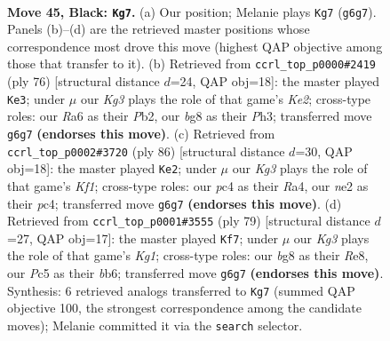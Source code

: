 \documentclass[11pt]{article}
\begin{document}
\clearpage

\begin{figure}[p]\centering
\begin{subfigure}{0.46\textwidth}\centering
\resizebox{\linewidth}{!}{%
\newchessgame
\chessboard[
  setfen={6B1/p3r3/r2p2k1/2p5/2P3P1/7K/4NR2/8 b - - 3 45},
  showmover=false,
  pgfstyle=straightmove, color=movearrow, markmove={g6-g7}
]}
\caption{}
\end{subfigure}\hfill
\begin{subfigure}{0.46\textwidth}\centering
\resizebox{\linewidth}{!}{%
\newchessgame
\chessboard[
  setfen={8/8/4pk1p/1pr5/5P2/PR5P/1P2K3/8 w - - 5 39},
  showmover=false,
  pgfstyle=straightmove, color=movearrow, markmove={e2-e3}
]}
\caption{}
\end{subfigure}
\\[4pt]
\begin{subfigure}{0.46\textwidth}\centering
\resizebox{\linewidth}{!}{%
\newchessgame
\chessboard[
  setfen={1r6/8/8/3kp3/RPp4r/P7/2R2P2/5K2 w - - 1 44},
  showmover=false,
  pgfstyle=straightmove, color=movearrow, markmove={f1-e2}
]}
\caption{}
\end{subfigure}\hfill
\begin{subfigure}{0.46\textwidth}\centering
\resizebox{\linewidth}{!}{%
\newchessgame
\chessboard[
  setfen={4r1k1/1p1r4/pB1p1p2/5N2/8/8/PP6/K1R5 b - - 0 40},
  showmover=false,
  pgfstyle=straightmove, color=movearrow, markmove={g8-f7}
]}
\caption{}
\end{subfigure}
\caption{\textbf{Move 45, Black: \texttt{Kg7}.} (a) Our position; Melanie plays \texttt{Kg7} (\texttt{g6g7}). Panels (b)--(d) are the retrieved master positions whose correspondence most drove this move (highest QAP objective among those that transfer to it). (b) Retrieved from \texttt{ccrl\_top\_p0000\#2419} (ply 76) [structural distance $d$=24, QAP obj=18]: the master played \texttt{Ke3}; under $\mu$ our \emph{Kg3} plays the role of that game's \emph{Ke2}; cross-type roles: our \emph{R}a6 as their \emph{P}b2, our \emph{b}g8 as their \emph{P}h3; transferred move \texttt{g6g7} \textbf{(endorses this move)}. (c) Retrieved from \texttt{ccrl\_top\_p0002\#3720} (ply 86) [structural distance $d$=30, QAP obj=18]: the master played \texttt{Ke2}; under $\mu$ our \emph{Kg3} plays the role of that game's \emph{Kf1}; cross-type roles: our \emph{p}c4 as their \emph{R}a4, our \emph{n}e2 as their \emph{p}c4; transferred move \texttt{g6g7} \textbf{(endorses this move)}. (d) Retrieved from \texttt{ccrl\_top\_p0001\#3555} (ply 79) [structural distance $d$=27, QAP obj=17]: the master played \texttt{Kf7}; under $\mu$ our \emph{Kg3} plays the role of that game's \emph{Kg1}; cross-type roles: our \emph{b}g8 as their \emph{R}e8, our \emph{P}c5 as their \emph{b}b6; transferred move \texttt{g6g7} \textbf{(endorses this move)}. Synthesis: 6 retrieved analogs transferred to \texttt{Kg7} (summed QAP objective 100, the strongest correspondence among the candidate moves); Melanie committed it via the \texttt{search} selector.}
\label{fig:thought-m89}
\end{figure}
\end{document}
